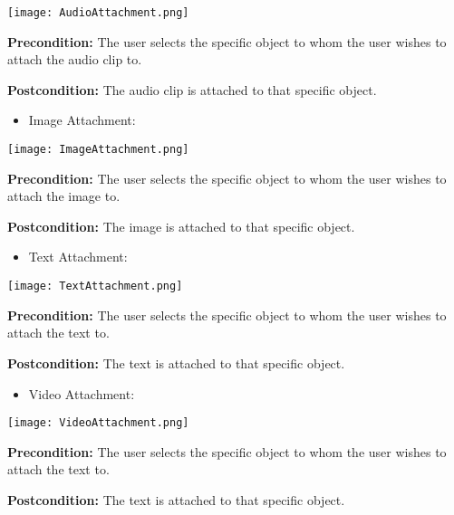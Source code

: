 \begin{flushleft}
	\begin{center}
	\texttt{[image: AudioAttachment.png]}
	\end{center}
	
	\textbf{Precondition:} The user selects the specific object to whom the user wishes to attach the audio clip to.
	
	\textbf{Postcondition:} The audio clip is attached to that specific object.
	
	\begin{itemize}
		\item Image Attachment:					
	\end{itemize}
	
	\begin{center}
	\texttt{[image: ImageAttachment.png]}
	\end{center}
	
	\textbf{Precondition:} The user selects the specific object to whom the user wishes to attach the image to.
	
	\textbf{Postcondition:} The image is attached to that specific object.
	
	\begin{itemize}
		\item Text Attachment:					
	\end{itemize}
	
	\begin{center}
	\texttt{[image: TextAttachment.png]}
	\end{center}
	
	\textbf{Precondition:} The user selects the specific object to whom the user wishes to attach the text to.
	
	\textbf{Postcondition:} The text is attached to that specific object.
	
	\begin{itemize}
		\item Video Attachment:					
	\end{itemize}
	
	\begin{center}
	\texttt{[image: VideoAttachment.png]}
	\end{center}
	
	\textbf{Precondition:} The user selects the specific object to whom the user wishes to attach the text to.
	
	\textbf{Postcondition:} The text is attached to that specific object.
	

\end{flushleft}
